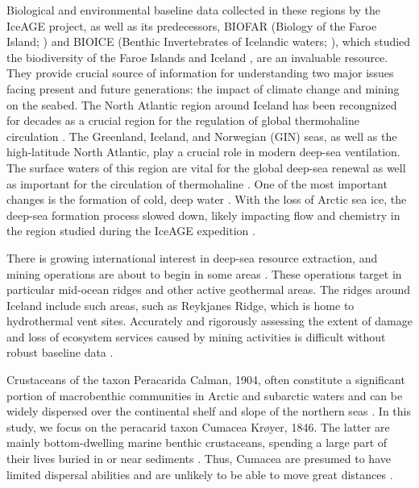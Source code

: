 Biological and environmental baseline data collected in these regions by the IceAGE project, as well as its predecessors, BIOFAR (Biology of the Faroe Island; \citep{norrevang_list_1994, gerken_cumacea_1999}) and BIOICE (Benthic Invertebrates of Icelandic waters; \citep{omarsdottir_biodiversity_2013}), which studied the biodiversity of the Faroe Islands and Iceland \citep{meisner_prefacebiodiversity_2018}, are an invaluable resource. They provide crucial source of information for understanding two major issues facing present and future generations: the impact of climate change and mining on the seabed. The North Atlantic region around Iceland has been recongnized for decades as a crucial region for the regulation of global thermohaline circulation \citep{meisner_prefacebiodiversity_2018}. The Greenland, Iceland, and Norwegian (GIN) seas, as well as the high-latitude North Atlantic, play a crucial role in modern deep-sea ventilation. The surface waters of this region are vital for the global deep-sea renewal as well as important for the circulation of thermohaline \citep{johannessen_relationship_1994}. One of the most important changes is the formation of cold, deep water \citep{winton_effect_1997, lohmann_sea_1998, meehl_global_2007, meisner_prefacebiodiversity_2018}. With the loss of Arctic sea ice, the deep-sea formation process slowed down, likely impacting flow and chemistry in the region studied during the IceAGE expedition \citep{meisner_prefacebiodiversity_2018}.

There is growing international interest in deep-sea resource extraction, and mining operations are about to begin in some areas \citep{nath_environment_2000, halfar_danger_2007, mengerink_call_2014}. These operations target in particular mid-ocean ridges and other active geothermal areas. The ridges around Iceland include such areas, such as Reykjanes Ridge, which is home to hydrothermal vent sites. Accurately and rigorously assessing the extent of damage and loss of ecosystem services caused by mining activities is difficult without robust baseline data \citep{meisner_prefacebiodiversity_2018}.

Crustaceans of the taxon Peracarida Calman, 1904, often constitute a significant portion of macrobenthic communities in Arctic and subarctic waters \citep{brandt_biodiversity_1997, conlan_distribution_2008, stransky_diversity_2010, uhlir_adding_2021} and can be widely dispersed over the continental shelf and slope of the northern seas \citep{hansen_crustacea_1916, just_amphipoda_1980, svavarsson_distribution_1990, svavarsson_deep-sea_1993, brandt_peracarid_1995, brandt_species_1996, uhlir_adding_2021}. In this study, we focus on the peracarid taxon Cumacea Krøyer, 1846. The latter are mainly bottom-dwelling marine benthic crustaceans, spending a large part of their lives buried in or near sediments \citep{uhlir_adding_2021}. Thus, Cumacea are presumed to have limited dispersal abilities and are unlikely to be able to move great distances \citep{rex_community_1981, wilson_speciation_1987, uhlir_adding_2021}.

